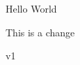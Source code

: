 \documentclass[A4paper, 12pt]{article}
\begin{document}
Hello World

This is a change

v1
\end{document}
